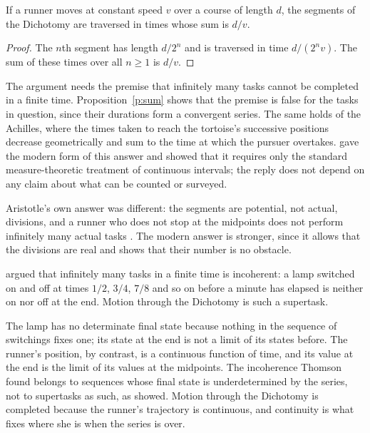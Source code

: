 \documentclass{situationist-preprint}
\begin{document}
\begin{proposition}\label{p:sum}
If a runner moves at constant speed $v$ over a course of length $d$, the segments of the Dichotomy are traversed in times whose sum is $d/v$.
\end{proposition}

\begin{proof}
The $n$th segment has length $d/2^n$ and is traversed in time $d/(2^n v)$. The sum of these times over all $n \geq 1$ is $d/v$.
\end{proof}

The argument needs the premise that infinitely many tasks cannot be completed in a finite time. Proposition~\ref{p:sum} shows that the premise is false for the tasks in question, since their durations form a convergent series. The same holds of the Achilles, where the times taken to reach the tortoise's successive positions decrease geometrically and sum to the time at which the pursuer overtakes. \citet{Grunbaum1967} gave the modern form of this answer and showed that it requires only the standard measure-theoretic treatment of continuous intervals; the reply does not depend on any claim about what can be counted or surveyed.

Aristotle's own answer was different: the segments are potential, not actual, divisions, and a runner who does not stop at the midpoints does not perform infinitely many actual tasks \citep[VIII.8]{AristotlePhys}. The modern answer is stronger, since it allows that the divisions are real and shows that their number is no obstacle.

\begin{objection}[Supertasks]
\citet{Thomson1954} argued that infinitely many tasks in a finite time is incoherent: a lamp switched on and off at times $1/2$, $3/4$, $7/8$ and so on before a minute has elapsed is neither on nor off at the end. Motion through the Dichotomy is such a supertask.
\end{objection}

\begin{reply}
The lamp has no determinate final state because nothing in the sequence of switchings fixes one; its state at the end is not a limit of its states before. The runner's position, by contrast, is a continuous function of time, and its value at the end is the limit of its values at the midpoints. The incoherence Thomson found belongs to sequences whose final state is underdetermined by the series, not to supertasks as such, as \citet{Benacerraf1962} showed. Motion through the Dichotomy is completed because the runner's trajectory is continuous, and continuity is what fixes where she is when the series is over.
\end{reply}
\end{document}
